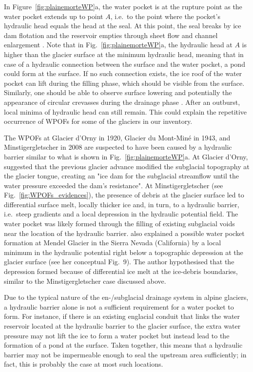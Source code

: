 In Figure~\ref{fig:plainemorteWP}a, the water pocket is at the rupture point as the water pocket extends up to point $A$, i.e.\ to the point where the pocket's hydraulic head equals the head at the seal. At this point, the seal breaks by ice dam flotation and the reservoir empties through sheet flow and channel enlargement \citep[similar to the outburst mechanism of ice-marginal and subglacial lakes; ][]{Bjornsson2010}. Note that in Fig.~\ref{fig:plainemorteWP}a, the hydraulic head at $A$ is higher than the glacier surface at the minimum hydraulic head, meaning that in case of a hydraulic connection between the surface and the water pocket, a pond could form at the surface. If no such connection exists, the ice roof of the water pocket can lift during the filling phase, which should be visible from the surface. Similarly, one should be able to observe surface lowering and potentially the appearance of circular crevasses during the drainage phase \citep[e.g.][]{Konrad1998}. After an outburst, local minima of hydraulic head can still remain. This could explain the repetitive occurrence of WPOFs for some of the glaciers in our inventory. 

The WPOFs at Glacier d'Orny in 1920, Glacier du Mont-Miné in 1943, and Minstigergletscher in 2008 are suspected to have been caused by a hydraulic barrier similar to what is shown in Fig.~\ref{fig:plainemorteWP}a. At Glacier d'Orny, \cite{Mercanton1921} suggested that the previous glacier advance modified the subglacial topography at the glacier tongue, creating an "ice dam for the subglacial streamflow until the water pressure exceeded the dam's resistance". At Minstigergletscher (see Fig.~\ref{fig:WPOFs_evidences}), the presence of debris at the glacier surface led to differential surface melt, locally thicker ice and, in turn, to a hydraulic barrier, i.e.\  steep gradients and a local depression in the hydraulic potential field. The water pocket was likely formed through the filling of existing subglacial voids near the location of the hydraulic barrier. \cite{Konrad1998} also explained a possible water pocket formation at Mendel Glacier in the Sierra Nevada (California) by a local minimum in the hydraulic potential right below a topographic depression at the glacier surface (see her conceptual Fig.~9). The author hypothesised that the depression formed because of differential ice melt at the ice-debris boundaries, similar to the Minstigergletscher case discussed above. 

Due to the typical nature of the en-/subglacial drainage system in alpine glaciers, a hydraulic barrier alone is not a sufficient requirement for a water pocket to form. For instance, if there is an existing englacial conduit that links the water reservoir located at the hydraulic barrier to the glacier surface, the extra water pressure may not lift the ice to form a water pocket but instead lead to the formation of a pond at the surface. Taken together, this means that a hydraulic barrier may not be impermeable enough to seal the upstream area sufficiently; in fact, this is probably the case at most such locations.


